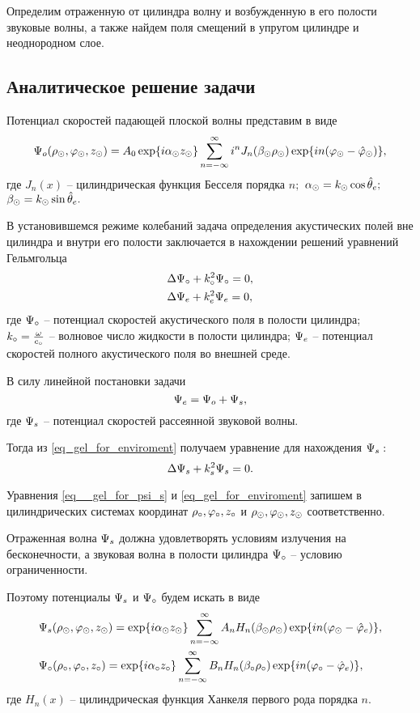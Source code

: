 Определим отраженную от цилиндра волну и возбужденную в его полости звуковые волны, а также найдем поля смещений в упругом цилиндре и неоднородном слое.

\newpage
\subsection{Аналитическое решение задачи}

Потенциал скоростей падающей плоской волны представим в виде
$$\P\o(\r\cyl, \f\cyl, z\cyl)=A_0\exp\{i\alpha\cyl z\cyl\}\sum_{n=-\infty}^{\infty}i^nJ_n(\beta\cyl \r\cyl)\exp\{in(\f\cyl-\hat\f\cyl)\},$$
где $J_n(x)$ -- цилиндрическая функция Бесселя порядка $n;$ $\alpha\cyl=k\cyl\cos\hat\theta\en;$ \\$\beta\cyl=k\cyl\sin\hat\theta\en.$

В установившемся режиме колебаний задача определения акустических полей вне цилиндра и внутри его полости заключается в нахождении решений уравнений Гельмгольца
\begin{align}
&\Lap\P\c+k\c^2\P\c=0,\\
&\Lap\P\en+k\en^2\P\en=0\label{eq_gel_for_enviroment},
\end{align}
где $\P\c$ -- потенциал скоростей акустического поля в полости цилиндра;\\ $k\c=\frac{\omega}{c\c}$ -- волновое число жидкости в полости цилиндра;
$\P\en$ -- потенциал скоростей полного акустического поля во внешней среде. 

В силу линейной постановки задачи
\begin{equation}
\P\en=\P\o+\P_s,
\end{equation}
где $\P_s$ -- потенциал скоростей рассеянной звуковой волны.

Тогда из \eqref{eq_gel_for_enviroment} получаем уравнение для нахождения $\P_s:$
\begin{equation}\label{eq__gel_for_psi_s}
\Lap\P_s+k_s^2\P_s=0.
\end{equation}

Уравнения \eqref{eq__gel_for_psi_s} и \eqref{eq_gel_for_enviroment} запишем в цилиндрических системах координат $\r\c, \f\c, z\c$ и $\r\cyl, \f\cyl, z\cyl$ соответственно. 

Отраженная волна $\P_s$ должна удовлетворять условиям излучения на бесконечности, а звуковая волна в полости цилиндра $\P\c$ -- условию ограниченности.

Поэтому потенциалы $\P_s$ и $\P\c$ будем искать в виде
\begin{align}
&\P_s(\r\cyl, \f\cyl, z\cyl)= \exp\{i\alpha\cyl z\cyl\}\sum_{n=-\infty}^{\infty}A_nH_n(\beta\cyl \r\cyl)\exp\{in(\f\cyl-\hat\f\en)\},\label{razloj_psi_s}\\
&\P\c(\r\c, \f\c, z\c)= \exp\{i\alpha\c z\c\}\sum_{n=-\infty}^{\infty}B_nH_n(\beta\c \r\c)\exp\{in(\f\c-\hat\f\en)\},\label{razloj_psi_o}
\end{align}
где $H_n(x)$ -- цилиндрическая функция Ханкеля первого рода порядка $n.$

